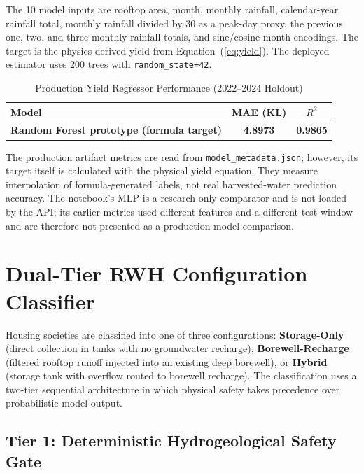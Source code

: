 ﻿\documentclass[conference]{IEEEtran}
\begin{document}
The 10 model inputs are rooftop area, month, monthly rainfall, calendar-year rainfall total, monthly rainfall divided by 30 as a peak-day proxy, the previous one, two, and three monthly rainfall totals, and sine/cosine month encodings. The target is the physics-derived yield from Equation~(\ref{eq:yield}). The deployed estimator uses 200 trees with \texttt{random\_state=42}.

\begin{table}[htbp]
\caption{Production Yield Regressor Performance (2022--2024 Holdout)}
\begin{center}
\begin{tabular}{lcc}
\toprule
\textbf{Model} & \textbf{MAE (KL)} & \textbf{$R^2$} \\
\midrule
\textbf{Random Forest prototype (formula target)} & \textbf{4.8973} & \textbf{0.9865} \\
\bottomrule
\end{tabular}
\label{tab:yield-model}
\end{center}
\end{table}

The production artifact metrics are read from \texttt{model\_metadata.json}; however, its target itself is calculated with the physical yield equation. They measure interpolation of formula-generated labels, not real harvested-water prediction accuracy. The notebook's MLP is a research-only comparator and is not loaded by the API; its earlier metrics used different features and a different test window and are therefore not presented as a production-model comparison.

\section{Dual-Tier RWH Configuration Classifier}
\label{sec:classifier}

Housing societies are classified into one of three configurations: \textbf{Storage-Only} (direct collection in tanks with no groundwater recharge), \textbf{Borewell-Recharge} (filtered rooftop runoff injected into an existing deep borewell), or \textbf{Hybrid} (storage tank with overflow routed to borewell recharge). The classification uses a two-tier sequential architecture in which physical safety takes precedence over probabilistic model output.

\subsection{Tier 1: Deterministic Hydrogeological Safety Gate}
\end{document}
